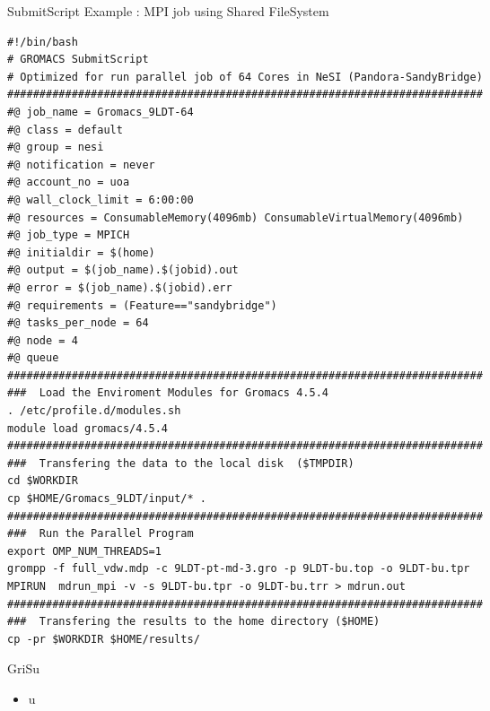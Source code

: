 \documentclass[final,t]{beamer}
\begin{document}
\begin{frame}[fragile]{}
\begin{columns}[t]
\begin{column}{.3\linewidth}
    \end{column}

    
    \begin{column}{.35\linewidth}
    
      \begin{block}{SubmitScript Example : MPI job using Shared FileSystem}
              \vspace*{-3ex}
        \begin{verbatim}
#!/bin/bash 
# GROMACS SubmitScript 
# Optimized for run parallel job of 64 Cores in NeSI (Pandora-SandyBridge)
##########################################################################
#@ job_name = Gromacs_9LDT-64
#@ class = default
#@ group = nesi
#@ notification = never
#@ account_no = uoa
#@ wall_clock_limit = 6:00:00
#@ resources = ConsumableMemory(4096mb) ConsumableVirtualMemory(4096mb)
#@ job_type = MPICH
#@ initialdir = $(home)
#@ output = $(job_name).$(jobid).out
#@ error = $(job_name).$(jobid).err
#@ requirements = (Feature=="sandybridge")
#@ tasks_per_node = 64
#@ node = 4
#@ queue
########################################################################## 
###  Load the Enviroment Modules for Gromacs 4.5.4
. /etc/profile.d/modules.sh
module load gromacs/4.5.4
########################################################################## 
###  Transfering the data to the local disk  ($TMPDIR)
cd $WORKDIR
cp $HOME/Gromacs_9LDT/input/* .
########################################################################## 
###  Run the Parallel Program
export OMP_NUM_THREADS=1
grompp -f full_vdw.mdp -c 9LDT-pt-md-3.gro -p 9LDT-bu.top -o 9LDT-bu.tpr
MPIRUN  mdrun_mpi -v -s 9LDT-bu.tpr -o 9LDT-bu.trr > mdrun.out 
########################################################################## 
###  Transfering the results to the home directory ($HOME) 
cp -pr $WORKDIR $HOME/results/
        \end{verbatim}
        \vspace*{-4ex}
      \end{block}

      
      \begin{block}{GriSu}
        \begin{itemize}
        \item  u
        \end{itemize}
      \end{block}
      
    \end{column}
  \end{columns}
\end{frame}
\end{document}
